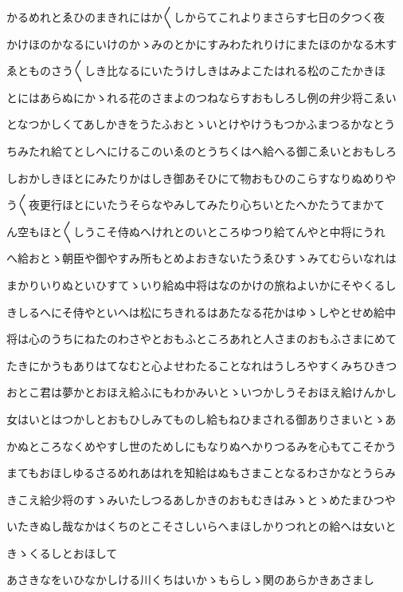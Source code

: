 \documentclass[a4paper,11pt,landscape]{ltjtarticle}
\begin{document}
かるめれとゑひのまきれにはか〱しからてこれよりまさらす七日の夕つく夜
\par\medskip
かけほのかなるにいけのかゝみのとかにすみわたれりけにまたほのかなる木す
\par\medskip
ゑとものさう〱しき比なるにいたうけしきはみよこたはれる松のこたかきほ
\par\medskip
とにはあらぬにかゝれる花のさまよのつねならすおもしろし例の弁少将こゑい
\par\medskip
となつかしくてあしかきをうたふおとゝいとけやけうもつかふまつるかなとう
\par\medskip
ちみたれ給てとしへにけるこのいゑのとうちくはへ給へる御こゑいとおもしろ
\par\medskip
しおかしきほとにみたりかはしき御あそひにて物おもひのこらすなりぬめりや
\par\medskip
う〱夜更行ほとにいたうそらなやみしてみたり心ちいとたへかたうてまかて
\par\medskip
ん空もほと〱しうこそ侍ぬへけれとのいところゆつり給てんやと中将にうれ
\par\medskip
へ給おとゝ朝臣や御やすみ所もとめよおきないたうゑひすゝみてむらいなれは
\par\medskip
まかりいりぬといひすてゝいり給ぬ中将はなのかけの旅ねよいかにそやくるし
\par\medskip
きしるへにそ侍やといへは松にちきれるはあたなる花かはゆゝしやとせめ給中
\par\medskip
将は心のうちにねたのわさやとおもふところあれと人さまのおもふさまにめて
\par\medskip
たきにかうもありはてなむと心よせわたることなれはうしろやすくみちひきつ
\par\medskip
おとこ君は夢かとおほえ給ふにもわかみいとゝいつかしうそおほえ給けんかし
\par\medskip
女はいとはつかしとおもひしみてものし給もねひまされる御ありさまいとゝあ
\par\medskip
かぬところなくめやすし世のためしにもなりぬへかりつるみを心もてこそかう
\par\medskip
まてもおほしゆるさるめれあはれを知給はぬもさまことなるわさかなとうらみ
\par\medskip
きこえ給少将のすゝみいたしつるあしかきのおもむきはみゝとゝめたまひつや
\par\medskip
いたきぬし哉なかはくちのとこそさしいらへまほしかりつれとの給へは女いと
\par\medskip
きゝくるしとおほして
\par\medskip
あさきなをいひなかしける川くちはいかゝもらしゝ関のあらかきあさまし
\end{document}
